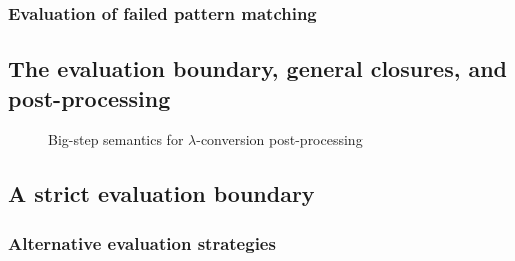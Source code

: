 
\subsubsection{Evaluation of failed pattern matching}
\label{sec:failed_pattern_match}

\subsection{The evaluation boundary, general closures, and post-processing}
\label{sec:closures_to_lambdas}





\begin{figure}
  \centering
  \begin{mdframed}
    \begin{singlespace}
      
    \end{singlespace}
  \end{mdframed}
  \caption{Big-step semantics for $\lambda$-conversion post-processing}
  \label{fig:big-step-inside-formal}
\end{figure}

\subsection{A strict evaluation boundary}
\label{sec:eval_boundary}


\subsubsection{Alternative evaluation strategies}
\label{sec:pattern_nomatch_strategies}


